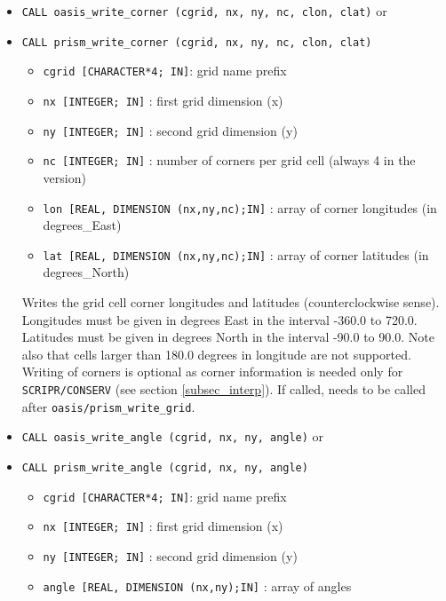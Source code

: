 \begin{itemize}
\vspace{0.2cm}
\item {\tt CALL oasis\_write\_corner (cgrid, nx, ny, nc, clon, clat)} or
\item {\tt CALL prism\_write\_corner (cgrid, nx, ny, nc, clon, clat)}

 \begin{itemize}
    \item {\tt cgrid [CHARACTER*4; IN]}: grid name prefix
    \item {\tt nx [INTEGER; IN]} : first grid dimension (x)
    \item {\tt ny [INTEGER; IN]} : second grid dimension (y)
    \item {\tt nc [INTEGER; IN]} : number of corners per grid cell (always 4 in the version)
    \item {\tt lon [REAL, DIMENSION (nx,ny,nc);IN]} : array of corner
    longitudes (in degrees\_East)
    \item {\tt lat [REAL, DIMENSION (nx,ny,nc);IN]} : array of corner
    latitudes (in degrees\_North)
 \end{itemize}

 Writes the grid cell corner longitudes and latitudes
 (counterclockwise sense). Longitudes must be given in degrees East in
 the interval -360.0 to 720.0. Latitudes must be given in degrees
 North in the interval -90.0 to 90.0. Note also that cells larger than
 180.0 degrees in longitude are not supported. Writing of corners is
 optional as corner information is needed only for {\tt
   SCRIPR/CONSERV} (see section \ref{subsec_interp}). If called, needs
 to be called after {\tt oasis/prism\_write\_grid}.

\vspace{0.2cm}
\item {\tt CALL oasis\_write\_angle (cgrid, nx, ny, angle)} or
\item {\tt CALL prism\_write\_angle (cgrid, nx, ny, angle)}

 \begin{itemize}
    \item {\tt cgrid [CHARACTER*4; IN]}: grid name prefix
    \item {\tt nx [INTEGER; IN]} : first grid dimension (x)
    \item {\tt ny [INTEGER; IN]} : second grid dimension (y)
    \item {\tt angle [REAL, DIMENSION (nx,ny);IN]} : array of angles
 \end{itemize}


\end{itemize}
